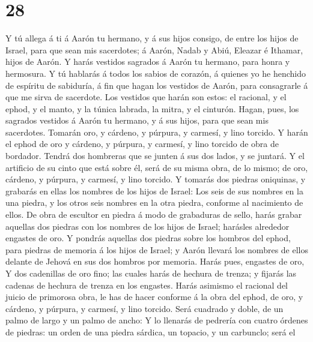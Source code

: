 \hypertarget{section-27}{%
\section{28}\label{section-27}}

 Y tú allega á ti á Aarón tu hermano, y á sus hijos
consigo, de entre los hijos de Israel, para que sean mis sacerdotes; á
Aarón, Nadab y Abiú, Eleazar é Ithamar, hijos de Aarón.  Y
harás vestidos sagrados á Aarón tu hermano, para honra y hermosura.
 Y tú hablarás á todos los sabios de corazón, á quienes yo
he henchido de espíritu de sabiduría, á fin que hagan los vestidos de
Aarón, para consagrarle á que me sirva de sacerdote.  Los
vestidos que harán son estos: el racional, y el ephod, y el manto, y la
túnica labrada, la mitra, y el cinturón. Hagan, pues, los sagrados
vestidos á Aarón tu hermano, y á sus hijos, para que sean mis
sacerdotes.  Tomarán oro, y cárdeno, y púrpura, y carmesí,
y lino torcido.  Y harán el ephod de oro y cárdeno, y
púrpura, y carmesí, y lino torcido de obra de bordador. 
Tendrá dos hombreras que se junten á sus dos lados, y se juntará.
 Y el artificio de su cinto que está sobre él, será de su
misma obra, de lo mismo; de oro, cárdeno, y púrpura, y carmesí, y lino
torcido.  Y tomarás dos piedras oniquinas, y grabarás en
ellas los nombres de los hijos de Israel:  Los seis de
sus nombres en la una piedra, y los otros seis nombres en la otra
piedra, conforme al nacimiento de ellos.  De obra de
escultor en piedra á modo de grabaduras de sello, harás grabar aquellas
dos piedras con los nombres de los hijos de Israel; harásles alrededor
engastes de oro.  Y pondrás aquellas dos piedras sobre
los hombros del ephod, para piedras de memoria á los hijos de Israel; y
Aarón llevará los nombres de ellos delante de Jehová en sus dos hombros
por memoria.  Harás pues, engastes de oro,
 Y dos cadenillas de oro fino; las cuales harás de
hechura de trenza; y fijarás las cadenas de hechura de trenza en los
engastes.  Harás asimismo el racional del juicio de
primorosa obra, le has de hacer conforme á la obra del ephod, de oro, y
cárdeno, y púrpura, y carmesí, y lino torcido.  Será
cuadrado y doble, de un palmo de largo y un palmo de ancho:
 Y lo llenarás de pedrería con cuatro órdenes de piedras:
un orden de una piedra sárdica, un topacio, y un carbunclo; será el
